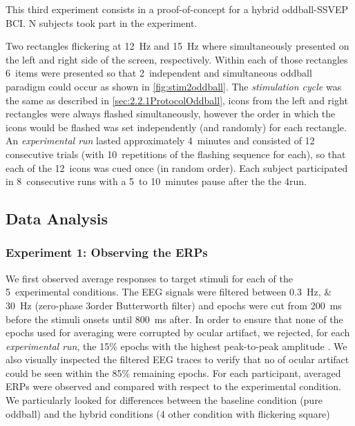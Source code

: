 \documentclass[10pt]{article}
\begin{document}
        This third experiment consists in a proof-of-concept for a hybrid oddball-\ac{SSVEP} \ac{BCI}.
        N subjects took part in the experiment.

        Two rectangles flickering at \SI{12}{\Hz} and \SI{15}{\Hz} where simultaneously presented on the left and right side of the screen, respectively.
        Within each of those rectangles 6~items were presented so that 2~independent and simultaneous oddball paradigm could occur as shown in \autoref{fig:stim2oddball}.
        The \emph{stimulation cycle} was the same as described in \autoref{sec:2.2.1ProtocolOddball}, icons from the left and right rectangles were always flashed simultaneously, however the order in which the icons would be flashed was set independently (and randomly) for each rectangle.
        An \emph{experimental run} lasted approximately 4~minutes and consisted of 12 consecutive trials (with 10~repetitions of the flashing sequence for each), so that each of the 12~icons was cued once (in random order).
        Each subject participated in 8~consecutive runs with a 5~to 10~minutes pause after the the 4\nth run.


    \subsection{Data Analysis}
    \label{sec:2.3DataAnalysis}

        \subsubsection{Experiment 1: Observing the \acsp{ERP}}
        \label{sec:2.3.1AnalysisExp1}

        We first observed average responses to target stimuli for each of the 5~experimental conditions.
        The \ac{EEG} signals were filtered between \SIlist[list-units = single]{0.3;30}{\Hz} (zero-phase 3\rd order Butterworth filter) and epochs were cut from \SI{200}{\ms} before the stimuli onsets until \SI{800}{\ms} after.
        In order to ensure that none of the epochs used for averaging were corrupted by ocular artifact, we rejected, for each \emph{experimental run}, the 15\% epochs with the highest peak-to-peak amplitude \parencite{Luck2005}.
        We also visually inspected the filtered \ac{EEG} traces to verify that no of ocular artifact could be seen within the 85\% remaining epochs.
        For each participant, averaged \acp{ERP} were observed and compared with respect to the experimental condition.
        We particularly looked for differences between the baseline condition (pure oddball) and the hybrid conditions (4 other condition with flickering square) %
\end{document}
